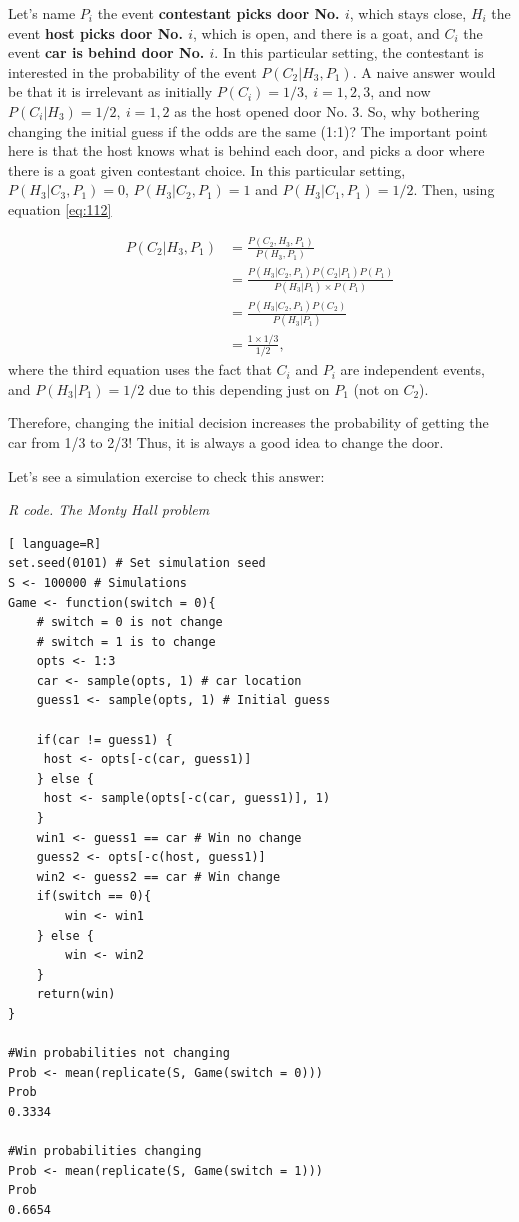 Let's name $P_i$ the event \textbf{contestant picks door No. $i$}, which stays close, $H_i$ the event \textbf{host picks door No. $i$}, which is open, and there is a goat, and $C_i$ the event \textbf{car is behind door No. $i$}. In this particular setting, the contestant is interested in the probability of the event $P(C_2|H_3,P_1)$. A naive answer would be that it is irrelevant as initially $P(C_i)=1/3, \ i=1,2,3$, and now $P(C_i|H_3)=1/2, \ i=1,2$ as the host opened door No. 3. So, why bothering changing the initial guess if the odds are the same (1:1)? The important point here is that the host knows what is behind each door, and picks a door where there is a goat given contestant choice. In this particular setting, $P(H_3|C_3,P_1)=0$, $P(H_3|C_2,P_1)=1$ and $P(H_3|C_1,P_1)=1/2$. Then, using equation \ref{eq:112} 

\begin{align*}
	P(C_2|H_3,P_1)&= \frac{P(C_2,H_3,P_1)}{P(H_3,P_1)}\\
	&= \frac{P(H_3|C_2,P_1)P(C_2|P_1)P(P_1)}{P(H_3|P_1)\times P(P_1)}\\
	&= \frac{P(H_3|C_2,P_1)P(C_2)}{P(H_3|P_1)}\\
	&=\frac{1\times 1/3}{1/2},
\end{align*}
where the third equation uses the fact that $C_i$ and $P_i$ are independent events, and $P(H_3|P_1)=1/2$ due to this depending just on $P_1$ (not on $C_2$).

Therefore, changing the initial decision increases the probability of getting the car from 1/3 to 2/3! Thus, it is always a good idea to change the door.

Let's see a simulation exercise to check this answer:

\begin{tcolorbox}[enhanced,width=4.67in,center upper,
	fontupper=\large\bfseries,drop shadow southwest,sharp corners]
\textit{R code. The Monty Hall problem}
\begin{VF}
\begin{lstlisting}[ language=R]
set.seed(0101) # Set simulation seed
S <- 100000 # Simulations
Game <- function(switch = 0){
	# switch = 0 is not change  
	# switch = 1 is to change
	opts <- 1:3 
	car <- sample(opts, 1) # car location
	guess1 <- sample(opts, 1) # Initial guess 
	
	if(car != guess1) {
	 host <- opts[-c(car, guess1)]
	} else {
	 host <- sample(opts[-c(car, guess1)], 1)
	}	
	win1 <- guess1 == car # Win no change
	guess2 <- opts[-c(host, guess1)]	
	win2 <- guess2 == car # Win change
	if(switch == 0){
		win <- win1
	} else {
		win <- win2
	}
	return(win)
}

#Win probabilities not changing
Prob <- mean(replicate(S, Game(switch = 0))) 
Prob
0.3334

#Win probabilities changing
Prob <- mean(replicate(S, Game(switch = 1))) 
Prob
0.6654
\end{lstlisting}
\end{VF}
\end{tcolorbox}

